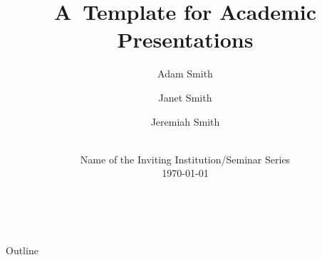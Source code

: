 

\newcommand{\balA}[1][1]{BAL$^\mathup{I}_{#1:#1}$\xspace}
\newcommand{\unbalA}[1][n]{UNBAL$^\mathup{I}_{1:#1}$\xspace}
\newcommand{\balB}[1][1]{BAL$^\mathup{II}_{#1:#1}$\xspace}
\newcommand{\unbalB}[1][n]{UNBAL$^\mathup{II}_{#1:1}$\xspace}



\title{A~Template for Academic Presentations}

\author[Smith, Smith, and Smith]{%
	Adam Smith \and
	\alert{Janet Smith} \and
	Jeremiah Smith
} %


\date{%
	\\
	Name of the Inviting Institution/Seminar Series \\[\medskipamount]
	\textmd{\today}%
}






\begin{frame}[standout]{~}

	\Wider{%
		\titlepage%
	}

\end{frame}



\begin{frame}[standout]{Outline}

	\medskip
	\tableofcontents

\end{frame}




